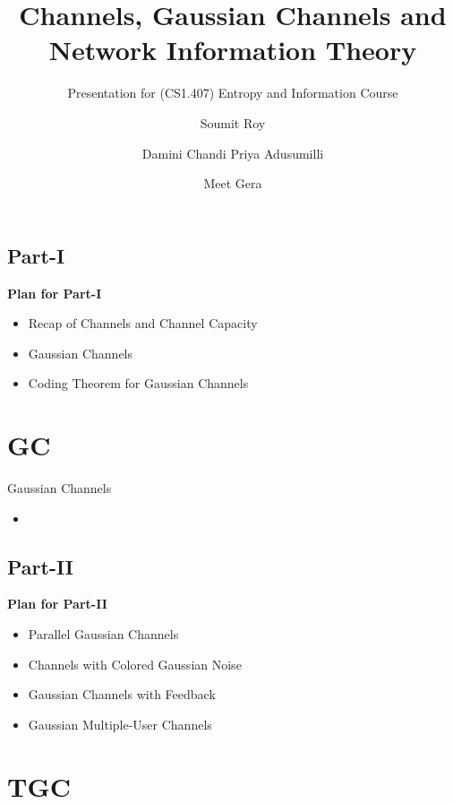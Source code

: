 \documentclass{beamer}
\title{Channels, Gaussian Channels and Network Information Theory}
\subtitle{Presentation for (CS1.407) Entropy and Information Course}
\author[Soumit, Damini, Meet] %
{Soumit Roy\inst{1} \and Damini Chandi Priya Adusumilli\inst{2} \and Meet Gera\inst{3}}
\institute[IIITH] %
{
  \inst{1}%
  Ph.D. Student (Roll No: 2023811002), CQST, IIITH
  \and
  \inst{2}%
  DD Student (Roll No: 2023122005), CVEST, IIITH
  \and
  \inst{3}%
  SD Student (Roll No: 2022102039), RRC ,IIITH
}
\date{\red{\today}}
\begin{document}
\frame{\titlepage}
\logo{}
\begin{frame}
\subsection{Part-I}

\textbf{Plan for Part-I}
\begin{itemize}
    \item Recap of Channels and Channel Capacity
    \item Gaussian Channels
    \item Coding Theorem for Gaussian Channels
\end{itemize}
%
\end{frame}

\section{GC}

\begin{frame}{Gaussian Channels}
 \begin{itemize}
	\justifying

\item<1->  

	\end{itemize}
\end{frame}
\begin{frame}
\subsection{Part-II}

\textbf{Plan for Part-II}
\begin{itemize}
    \item Parallel Gaussian Channels
    \item Channels with Colored Gaussian Noise
    \item  Gaussian Channels with Feedback
    \item Gaussian Multiple-User Channels
\end{itemize}
%
\end{frame}
\section{TGC}
\end{document}
